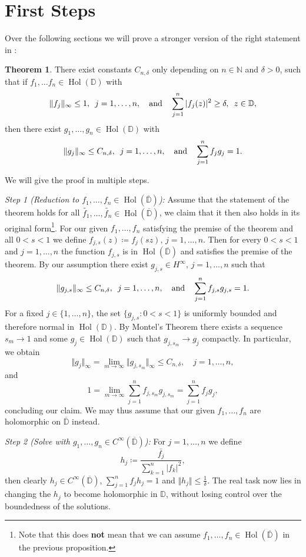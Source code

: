 \documentclass[letterpaper, 11pt]{article}
\newcommand{\D}{\mathbb{D}}
\newcommand{\N}{\mathbb{N}}
\newcommand{\1}{\mathds{1}}
\newcommand{\cl}[1]{\overline{#1}}
\DeclareMathOperator*{\Hol}{Hol}
\theoremstyle{definition}
\newtheorem{theorem}{Theorem}
\newenvironment{innerproof}
 {\renewcommand{\qedsymbol}{}\proof}
 {\endproof}
\begin{document}
\section{First Steps}

Over the following sections we will prove a stronger version of the right statement in :

\begin{theorem}
  There exist constants $C_{n,\delta}$ only depending on $n \in \N$ and $\delta > 0$, such that if $f_1, \dots f_n \in \Hol(\D)$ with
  $$ \Vert f_j \Vert_\infty \leq 1, \hspace{0.5em} j = 1, \dots, n, \quad \textrm{and} \quad \sum_{j=1}^n \vert f_j(z) \vert^2 \geq \delta, \hspace{0.5em} z \in \D, $$
  then there exist $g_1, \dots, g_n \in \Hol(\D)$ with
  $$ \Vert g_j \Vert_\infty \leq C_{n,\delta}, \hspace{0.5em} j = 1, \dots, n, \quad \textrm{and} \quad \sum_{j=1}^n f_j g_j = 1. $$
\end{theorem}

\begin{innerproof}
  We will give the proof in multiple steps.

  \textit{Step 1 (Reduction to $f_1, \dots, f_n \in \Hol(\cl{\D})$):} Assume that the statement of the theorem holds for all $\widetilde{f_1}, \dots, \widetilde{f_n} \in \Hol(\cl{\D})$, we claim that it then also holds in its original form\footnote{Note that this does \textbf{not} mean that we can assume $f_1, \dots, f_n \in \Hol(\cl{\D})$ in the previous proposition.}. For our given $f_1, \dots, f_n$ satisfying the premise of the theorem and all $0 < s < 1$ we define $ f_{j,s}(z) \coloneqq f_{j}(sz), \, j=1,\dots,n $. Then for every $0 < s < 1$ and $j = 1, \dots, n$ the function $f_{j,s}$ is in $\Hol(\cl{\D})$ and satisfies the premise of the theorem. By our assumption there exist $g_{j,s} \in H^\infty, \, j=1,\dots,n$ such that
  $$ \Vert g_{j,s} \Vert_\infty \leq C_{n,\delta}, \hspace{0.5em} j = 1, \dots, n, \quad \textrm{and} \quad \sum_{j=1}^n f_{j,s} g_{j,s} = 1. $$
  For a fixed $j \in \{ 1, \dots, n \}$, the set $\{ g_{j,s} : 0 < s < 1 \}$ is uniformly bounded and therefore normal in $\Hol(\D)$. By Montel's Theorem there exists a sequence $s_m \to 1$ and some $g_j \in \Hol(\D)$ such that $g_{j,s_m} \to g_{j}$ compactly. In particular, we obtain
  $$ \Vert g_j \Vert_\infty = \lim_{m \to \infty} \Vert g_{j,s_m} \Vert_\infty \leq C_{n,\delta}, \quad j=1,\dots,n, $$
  and
  $$ 1 = \lim_{m \to \infty} \sum_{j=1}^n f_{j,s_m} g_{j,s_m} = \sum_{j=1}^n f_j g_j, $$
  concluding our claim. We may thus assume that our given $f_1, \dots, f_n$ are holomorphic on $\cl{\D}$ instead.

  \textit{Step 2 (Solve with $g_1, \dots, g_n \in C^\infty(\cl{\D})$):} For $j=1,\dots,n$ we define
  $$ h_j \coloneqq \frac{\bar{f_j}}{\sum_{k=1}^n \vert f_k \vert^2}, $$
  then clearly $h_j \in C^\infty(\cl{\D})$, $ \sum_{j=1}^n f_j h_j = 1$ and $\Vert h_j \Vert \leq \frac{1}{\delta}$. The real task now lies in changing the $h_j$ to become holomorphic in $\D$, without losing control over the boundedness of the solutions.
\end{innerproof}
\end{document}
